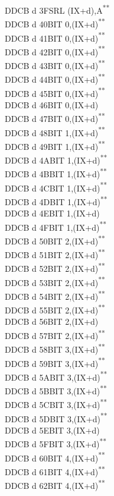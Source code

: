 \documentclass[12pt,twoside,openright,a4paper]{book}
\newcommand{\UNDOC}{\textnormal{\textsuperscript{**}}}
\begin{document}
\begin{multicols}{3}
{\begin{tabbing}
	DDCB d 3F\>SRL (IX+d),A\UNDOC\\
	DDCB d 40\>BIT 0,(IX+d)\UNDOC\\
	DDCB d 41\>BIT 0,(IX+d)\UNDOC\\
	DDCB d 42\>BIT 0,(IX+d)\UNDOC\\
	DDCB d 43\>BIT 0,(IX+d)\UNDOC\\
	DDCB d 44\>BIT 0,(IX+d)\UNDOC\\
	DDCB d 45\>BIT 0,(IX+d)\UNDOC\\
	DDCB d 46\>BIT 0,(IX+d)\\
	DDCB d 47\>BIT 0,(IX+d)\UNDOC\\
	DDCB d 48\>BIT 1,(IX+d)\UNDOC\\
	DDCB d 49\>BIT 1,(IX+d)\UNDOC\\
	DDCB d 4A\>BIT 1,(IX+d)\UNDOC\\
	DDCB d 4B\>BIT 1,(IX+d)\UNDOC\\
	DDCB d 4C\>BIT 1,(IX+d)\UNDOC\\
	DDCB d 4D\>BIT 1,(IX+d)\UNDOC\\
	DDCB d 4E\>BIT 1,(IX+d)\\
	DDCB d 4F\>BIT 1,(IX+d)\UNDOC\\
	DDCB d 50\>BIT 2,(IX+d)\UNDOC\\
	DDCB d 51\>BIT 2,(IX+d)\UNDOC\\
	DDCB d 52\>BIT 2,(IX+d)\UNDOC\\
	DDCB d 53\>BIT 2,(IX+d)\UNDOC\\
	DDCB d 54\>BIT 2,(IX+d)\UNDOC\\
	DDCB d 55\>BIT 2,(IX+d)\UNDOC\\
	DDCB d 56\>BIT 2,(IX+d)\\
	DDCB d 57\>BIT 2,(IX+d)\UNDOC\\
	DDCB d 58\>BIT 3,(IX+d)\UNDOC\\
	DDCB d 59\>BIT 3,(IX+d)\UNDOC\\
	DDCB d 5A\>BIT 3,(IX+d)\UNDOC\\
	DDCB d 5B\>BIT 3,(IX+d)\UNDOC\\
	DDCB d 5C\>BIT 3,(IX+d)\UNDOC\\
	DDCB d 5D\>BIT 3,(IX+d)\UNDOC\\
	DDCB d 5E\>BIT 3,(IX+d)\\
	DDCB d 5F\>BIT 3,(IX+d)\UNDOC\\
	DDCB d 60\>BIT 4,(IX+d)\UNDOC\\
	DDCB d 61\>BIT 4,(IX+d)\UNDOC\\
	DDCB d 62\>BIT 4,(IX+d)\UNDOC\\

\end{tabbing}}
\end{multicols}
\end{document}
